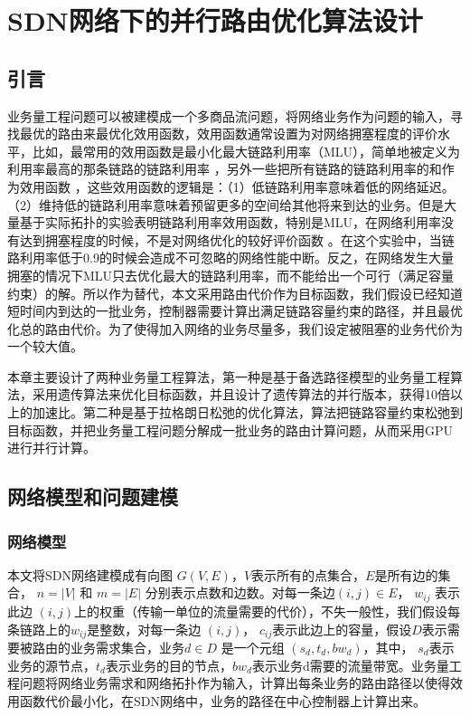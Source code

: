 \chapter{SDN网络下的并行路由优化算法设计}
\section{引言}
业务量工程问题可以被建模成一个多商品流问题，将网络业务作为问题的输入，寻找最优的路由来最优化效用函数，效用函数通常设置为对网络拥塞程度的评价水平，比如，最常用的效用函数是最小化最大链路利用率（MLU），简单地被定义为利用率最高的那条链路的链路利用率 ，另外一些把所有链路的链路利用率的和作为效用函数 ，这些效用函数的逻辑是：（1）低链路利用率意味着低的网络延迟。（2）维持低的链路利用率意味着预留更多的空间给其他将来到达的业务。但是大量基于实际拓扑的实验表明链路利用率效用函数，特别是MLU，在网络利用率没有达到拥塞程度的时候，不是对网络优化的较好评价函数 。在这个实验中，当链路利用率低于0.9的时候会造成不可忽略的网络性能中断。反之，在网络发生大量拥塞的情况下MLU只去优化最大的链路利用率，而不能给出一个可行（满足容量约束）的解。所以作为替代，本文采用路由代价作为目标函数，我们假设已经知道短时间内到达的一批业务，控制器需要计算出满足链路容量约束的路径，并且最优化总的路由代价。为了使得加入网络的业务尽量多，我们设定被阻塞的业务代价为一个较大值。

本章主要设计了两种业务量工程算法，第一种是基于备选路径模型的业务量工程算法，采用遗传算法来优化目标函数，并且设计了遗传算法的并行版本，获得10倍以上的加速比。第二种是基于拉格朗日松弛的优化算法，算法把链路容量约束松弛到目标函数，并把业务量工程问题分解成一批业务的路由计算问题，从而采用GPU进行并行计算。
\section{网络模型和问题建模}
\subsection{网络模型}

本文将SDN网络建模成有向图 $G(V, E)$，$V$表示所有的点集合，$E$是所有边的集合， $n = |V|$ 和 $m = |E|$ 分别表示点数和边数。对每一条边$(i,j)\in E$， $w_{ij}$ 表示此边 $(i,j)$上的权重（传输一单位的流量需要的代价），不失一般性，我们假设每条链路上的$w_{ij}$是整数，对每一条边 $(i,j)$， $c_{ij}$表示此边上的容量，假设$D$表示需要被路由的业务需求集合，业务$d \in D$ 是一个元组 $(s_d, t_d, bw_d)$，其中， $s_d$表示业务的源节点，$t_d$表示业务的目的节点，$bw_d$表示业务d需要的流量带宽。业务量工程问题将网络业务需求和网络拓扑作为输入，计算出每条业务的路由路径以使得效用函数代价最小化，在SDN网络中，业务的路径在中心控制器上计算出来。
